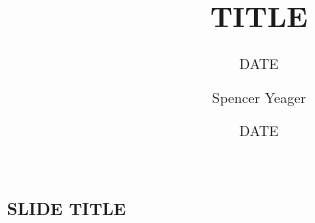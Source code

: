\documentclass{beamer}
\title[The University of Arizona]{TITLE}
\subtitle{DATE}
\author{Spencer Yeager}
\institute[]{SUBGROUP/GROUP}
\date{DATE}
\begin{document}
	\begin{frame}
		\titlepage
	\end{frame}

	\begin{frame}
		\frametitle{SLIDE TITLE}
	\end{frame}
\end{document}
